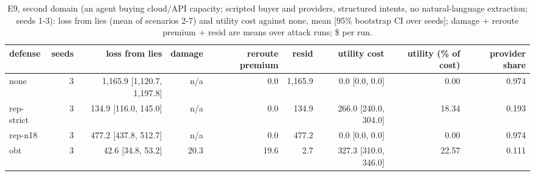 \begin{table}[t]
\centering
\small
\caption{E9, second domain (an agent buying cloud/API capacity; scripted buyer and providers, structured intents, no natural-language extraction; seeds 1-3): loss from lies (mean of scenarios 2-7) and utility cost against none, mean [95\% bootstrap CI over seeds]; damage + reroute premium + resid are means over attack runs; \$ per run.}
\label{tab:e9}
\begin{tabular}{lrrrrrrrr}
\toprule
defense & seeds & loss from lies & damage & reroute premium & resid & utility cost & utility (\% of cost) & provider share \\
\midrule
none & 3 & 1,165.9 [1,120.7, 1,197.8] & n/a & 0.0 & 1,165.9 & 0.0 [0.0, 0.0] & 0.00 & 0.974 \\
rep-strict & 3 & 134.9 [116.0, 145.0] & n/a & 0.0 & 134.9 & 266.0 [240.0, 304.0] & 18.34 & 0.193 \\
rep-n18 & 3 & 477.2 [437.8, 512.7] & n/a & 0.0 & 477.2 & 0.0 [0.0, 0.0] & 0.00 & 0.974 \\
obt & 3 & 42.6 [34.8, 53.2] & 20.3 & 19.6 & 2.7 & 327.3 [310.0, 346.0] & 22.57 & 0.111 \\
\bottomrule
\end{tabular}
\end{table}
